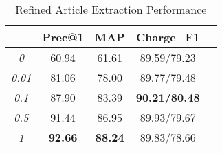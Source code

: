 
\begin{table}
\centering
\normalsize{
\begin{tabular}{|c|c|c|c|c|}
\hline
\bm{$\beta$}							& \textbf{Prec@1} 		& \textbf{MAP} 			& \textbf{Charge\_F1} \\
\hline
\textit{0} 								& 60.94								& 61.61 						& 89.59/79.23 	\\
\hline
\textit{0.01} 						& 81.06								& 78.00							& 89.77/79.48 	\\
\hline
\textit{0.1} 							& 87.90								& 83.39							& \textbf{90.21/80.48} 	\\
\hline
\textit{0.5} 							& 91.44								& 86.95							& 89.93/79.67 	\\
\hline
\textit{1} 								& \textbf{92.66}			& \textbf{88.24}		& 89.83/78.66 	\\
\hline
\end{tabular}
}
\caption{Refined Article Extraction Performance}
\label{tab_article_att}
\vspace{-0.5em}
\end{table}



